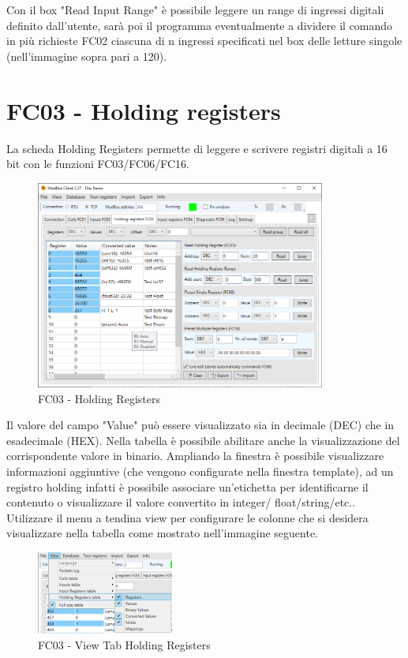 Con il box "Read Input Range" è possibile leggere un range di ingressi digitali definito dall'utente,
sarà poi il programma eventualmente a dividere il comando in più richieste FC02
ciascuna di n ingressi specificati nel box delle letture singole (nell'immagine sopra pari a 120).

\newpage
\section{FC03 - Holding registers}

La scheda Holding Registers permette di leggere e scrivere registri digitali a 16 bit con le funzioni
FC03/FC06/FC16.

\begin{figure}[H]
\centering
\includegraphics[width=0.85\textwidth]{../Img/Modbus_Client_HoldingReg_00.PNG}
\caption{FC03 - Holding Registers}
\end{figure}

Il valore del campo "Value" può essere visualizzato sia in decimale (DEC) che in esadecimale
(HEX). Nella tabella è possibile abilitare anche la visualizzazione del corrispondente valore in binario.
Ampliando la finestra è possibile visualizzare informazioni aggiuntive (che vengono configurate
nella finestra template), ad un registro holding infatti è possibile
associare un'etichetta per identificarne il contenuto o visualizzare il valore convertito in integer/
float/string/etc.. Utilizzare il menu a tendina view per configurare le colonne che si desidera visualizzare
nella tabella come mostrato nell'immagine seguente.

\begin{figure}[H]
\centering
\includegraphics[width=0.40\textwidth]{../Img/Menu_View_Holding.PNG}
\caption{FC03 - View Tab Holding Registers}
\end{figure}


